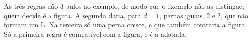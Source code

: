 As três regras dão 3 pulos no exemplo, de modo que o exemplo não as distingue; quem decide é a
figura. A segunda daria, para $d = 1$, pernas iguais, 2 e 2, que não formam um L. Na terceira
só uma perna cresce, o que também contraria a figura. Só a primeira regra é compatível com a
figura, e é a adotada.
